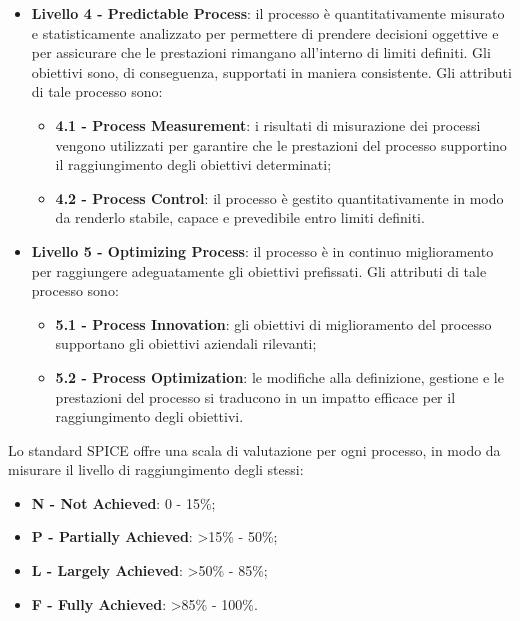 \begin{itemize}
\begin{itemize}
	\end{itemize}
	\item \textbf {Livello 4 - Predictable Process}: il processo è quantitativamente misurato e statisticamente analizzato per permettere di prendere decisioni oggettive e per assicurare che le prestazioni rimangano all'interno di limiti definiti. Gli obiettivi sono, di conseguenza, supportati in maniera consistente. Gli attributi di tale processo sono:
	\begin{itemize}
		\item \textbf{4.1 - Process Measurement}: i risultati di misurazione dei processi vengono utilizzati per garantire che le prestazioni del processo supportino il raggiungimento degli obiettivi determinati;
		\item \textbf{4.2 - Process Control}: il processo è gestito quantitativamente in modo da renderlo stabile, capace e prevedibile entro limiti definiti.
	\end{itemize}
	\item \textbf {Livello 5 - Optimizing Process}: il processo è in continuo miglioramento per raggiungere adeguatamente gli obiettivi prefissati. Gli attributi di tale processo sono:
	\begin{itemize}
		\item \textbf{5.1 - Process Innovation}: gli obiettivi di miglioramento del processo supportano gli obiettivi aziendali rilevanti;
		\item \textbf{5.2 - Process Optimization}: le modifiche alla definizione, gestione e le prestazioni del processo si traducono in un impatto efficace per il raggiungimento degli obiettivi.
	\end{itemize}
\end{itemize}

Lo standard SPICE offre una scala di valutazione per ogni processo, in modo da misurare il livello di raggiungimento degli stessi:
\begin{itemize}
	\item \textbf{N - Not Achieved}: 0 - 15\%;
	\item \textbf{P - Partially Achieved}: >15\% - 50\%;
	\item \textbf{L - Largely Achieved}: >50\% - 85\%;
	\item \textbf{F - Fully Achieved}: >85\% - 100\%.
\end{itemize}

